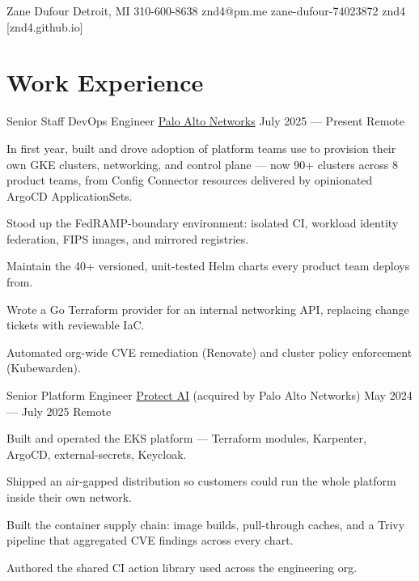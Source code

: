 \documentclass[letterpaper]{resume_config}
\begin{document}
\Header
    {Zane Dufour} %
    {Detroit, MI} %
    {310-600-8638} %
    {znd4@pm.me} %
    {zane-dufour-74023872} %
    {znd4} %
    [znd4.github.io] %


\section{Work Experience}

\WorkExperience
    {Senior Staff DevOps Engineer} %
    {\href{https://www.paloaltonetworks.com/}{Palo Alto Networks}} %
    {July 2025 --- Present} %
    {Remote} %
    {
        \item In first year, built and drove adoption of platform teams use to provision their own GKE clusters, networking, and control plane --- now 90+ clusters across 8 product teams, from Config Connector resources delivered by opinionated ArgoCD ApplicationSets.
        \item Stood up the FedRAMP-boundary environment: isolated CI, workload identity federation, FIPS images, and mirrored registries.
        \item Maintain the 40+ versioned, unit-tested Helm charts every product team deploys from.
        \item Wrote a Go Terraform provider for an internal networking API, replacing change tickets with reviewable IaC.
        \item Automated org-wide CVE remediation (Renovate) and cluster policy enforcement (Kubewarden).
    }

\WorkExperience
    {Senior Platform Engineer} %
    {\href{https://protectai.com/}{Protect AI} (acquired by Palo Alto Networks)} %
    {May 2024 --- July 2025} %
    {Remote} %
    {
        \item Built and operated the EKS platform --- Terraform modules, Karpenter, ArgoCD, external-secrets, Keycloak.
        \item Shipped an air-gapped distribution so customers could run the whole platform inside their own network.
        \item Built the container supply chain: image builds, pull-through caches, and a Trivy pipeline that aggregated CVE findings across every chart.
        \item Authored the shared CI action library used across the engineering org.
    }
\end{document}
